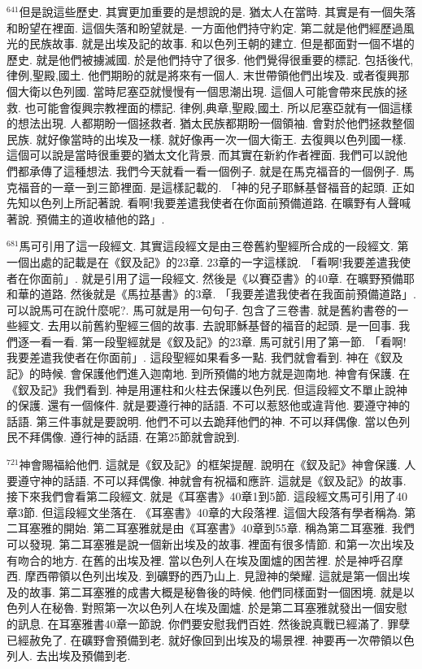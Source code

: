 \documentclass{book}
\begin{document}
$^{641}$但是說這些歷史.
其實更加重要的是想說的是.
猶太人在當時.
其實是有一個失落和盼望在裡面.
這個失落和盼望就是.
一方面他們持守約定.
第二就是他們經歷過風光的民族故事.
就是出埃及記的故事.
和以色列王朝的建立.
但是都面對一個不堪的歷史.
就是他們被擄滅國.
於是他們持守了很多.
他們覺得很重要的標記.
包括後代,律例,聖殿,國土.
他們期盼的就是將來有一個人.
末世帶領他們出埃及.
或者復興那個大衛以色列國.
當時尼塞亞就慢慢有一個思潮出現.
這個人可能會帶來民族的拯救.
也可能會復興宗教裡面的標記.
律例,典章,聖殿,國土.
所以尼塞亞就有一個這樣的想法出現.
人都期盼一個拯救者.
猶太民族都期盼一個領袖.
會對於他們拯救整個民族.
就好像當時的出埃及一樣.
就好像再一次一個大衛王.
去復興以色列國一樣.
這個可以說是當時很重要的猶太文化背景.
而其實在新約作者裡面.
我們可以說他們都承傳了這種想法.
我們今天就看一看一個例子.
就是在馬克福音的一個例子.
馬克福音的一章一到三節裡面.
是這樣記載的.
「神的兒子耶穌基督福音的起頭.
正如先知以色列上所記著說.
看啊!我要差遣我使者在你面前預備道路.
在曠野有人聲喊著說.
預備主的道收植他的路」.

$^{681}$馬可引用了這一段經文.
其實這段經文是由三卷舊約聖經所合成的一段經文.
第一個出處的記載是在《釵及記》的23章.
23章的一字這樣說.
「看啊!我要差遣我使者在你面前」.
就是引用了這一段經文.
然後是《以賽亞書》的40章.
在曠野預備耶和華的道路.
然後就是《馬拉基書》的3章.
「我要差遣我使者在我面前預備道路」.
可以說馬可在說什麼呢?.
馬可就是用一句句子.
包含了三卷書.
就是舊約書卷的一些經文.
去用以前舊約聖經三個的故事.
去說耶穌基督的福音的起頭.
是一回事.
我們逐一看一看.
第一段聖經就是《釵及記》的23章.
馬可就引用了第一節.
「看啊!我要差遣我使者在你面前」.
這段聖經如果看多一點.
我們就會看到.
神在《釵及記》的時候.
會保護他們進入迦南地.
到所預備的地方就是迦南地.
神會有保護.
在《釵及記》我們看到.
神是用運柱和火柱去保護以色列民.
但這段經文不單止說神的保護.
還有一個條件.
就是要遵行神的話語.
不可以惹怒他或違背他.
要遵守神的話語.
第三件事就是要說明.
他們不可以去跪拜他們的神.
不可以拜偶像.
當以色列民不拜偶像.
遵行神的話語.
在第25節就會說到.

$^{721}$神會賜福給他們.
這就是《釵及記》的框架提醒.
說明在《釵及記》神會保護.
人要遵守神的話語.
不可以拜偶像.
神就會有祝福和應許.
這就是《釵及記》的故事.
接下來我們會看第二段經文.
就是《耳塞書》40章1到5節.
這段經文馬可引用了40章3節.
但這段經文坐落在.
《耳塞書》40章的大段落裡.
這個大段落有學者稱為.
第二耳塞雅的開始.
第二耳塞雅就是由《耳塞書》40章到55章.
稱為第二耳塞雅.
我們可以發現.
第二耳塞雅是說一個新出埃及的故事.
裡面有很多情節.
和第一次出埃及有吻合的地方.
在舊的出埃及裡.
當以色列人在埃及圍爐的困苦裡.
於是神呼召摩西.
摩西帶領以色列出埃及.
到礦野的西乃山上.
見證神的榮耀.
這就是第一個出埃及的故事.
第二耳塞雅的成書大概是秘魯後的時候.
他們同樣面對一個困境.
就是以色列人在秘魯.
對照第一次以色列人在埃及圍爐.
於是第二耳塞雅就發出一個安慰的訊息.
在耳塞雅書40章一節說.
你們要安慰我們百姓.
然後說真戰已經滿了.
罪孽已經赦免了.
在礦野會預備到老.
就好像回到出埃及的場景裡.
神要再一次帶領以色列人.
去出埃及預備到老.
\end{document}
